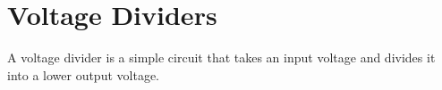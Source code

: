 \section{Voltage Dividers}
A voltage divider is a simple circuit that takes an input
voltage and divides it into a lower output voltage.




